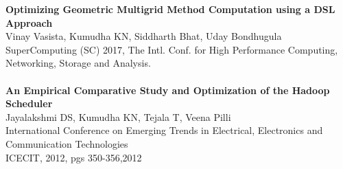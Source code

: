 \documentclass[a4paper,10pt]{article} %
\begin{document}
\textbf{Optimizing Geometric Multigrid Method Computation using a DSL Approach}\\
\small{Vinay Vasista, Kumudha KN, Siddharth Bhat, Uday Bondhugula} \\
\small{SuperComputing (SC) 2017, The Intl. Conf. for High Performance Computing, Networking, Storage and Analysis. \\ } \\


\textbf{An Empirical Comparative Study and Optimization of the Hadoop Scheduler} \\
\small{Jayalakshmi DS, Kumudha KN, Tejala T, Veena Pilli}\\
\small{International Conference on Emerging Trends in Electrical, Electronics and 
Communication Technologies \\ ICECIT, 2012, pgs 350-356,2012}
\\
\end{document}

